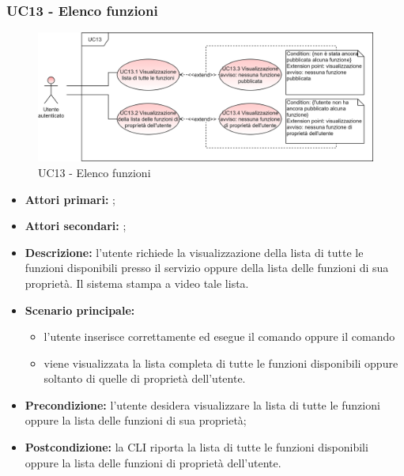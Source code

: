\subsubsection{UC13 - Elenco funzioni}
\begin{figure}[H]
	\centering
	\includegraphics[scale=\ucs]{./res/img/UC13.png}
	\caption {UC13 - Elenco funzioni}
\end{figure}
\begin{itemize}
	\item \textbf{Attori primari:} \ua{};
	\item \textbf{Attori secondari:} \re{};
	\item \textbf{Descrizione:} l’utente richiede la visualizzazione della lista di tutte le funzioni disponibili presso il servizio oppure della lista delle funzioni di sua proprietà. Il sistema stampa a video tale lista.
	\item \textbf{Scenario principale:} 
	\begin{itemize}
		\item l'utente inserisce correttamente ed esegue il comando \lista{} oppure il comando \plista{}
		\item viene visualizzata la lista completa di tutte le funzioni disponibili oppure soltanto di quelle di proprietà dell’utente. 
	\end{itemize}
	\item \textbf{Precondizione:} l’utente desidera visualizzare la lista di tutte le funzioni oppure la lista delle funzioni di sua proprietà;
	\item \textbf{Postcondizione:} la CLI riporta la lista di tutte le funzioni disponibili oppure la lista delle funzioni di proprietà dell’utente.
\end{itemize}